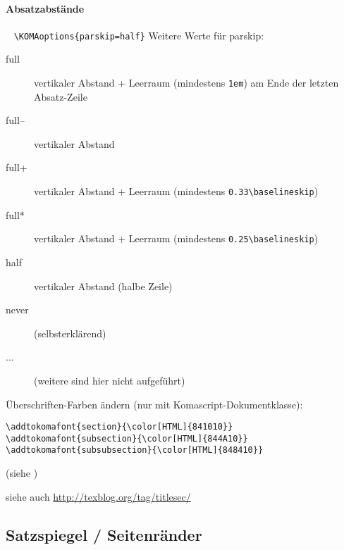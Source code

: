 \paragraph*{Absatzabstände} ~\linebreak
\lstinline|\KOMAoptions{parskip=half}| \linebreak
Weitere Werte für parskip:
\begin{description}
	\item[full] vertikaler Abstand + Leerraum (mindestens \lstinline|1em|) am Ende der letzten Absatz-Zeile
	\item[full--] vertikaler Abstand
	\item[full+] vertikaler Abstand + Leerraum (mindestens \lstinline|0.33\baselineskip|)
	\item[full*] vertikaler Abstand + Leerraum (mindestens \lstinline|0.25\baselineskip|)
	\item[half] vertikaler Abstand (halbe Zeile)
	\item[never] (selbsterklärend)
	\item[...] (weitere sind hier nicht aufgeführt)
\end{description}

\label{cha:ChapFormat}
Überschriften-Farben ändern (nur mit Komascript-Dokumentklasse):
\begin{lstlisting}
\addtokomafont{section}{\color[HTML]{841010}}
\addtokomafont{subsection}{\color[HTML]{844A10}}
\addtokomafont{subsubsection}{\color[HTML]{848410}}
\end{lstlisting}

(siehe )




siehe auch \url{http://texblog.org/tag/titlesec/}



\subsection{Satzspiegel / Seitenränder}


